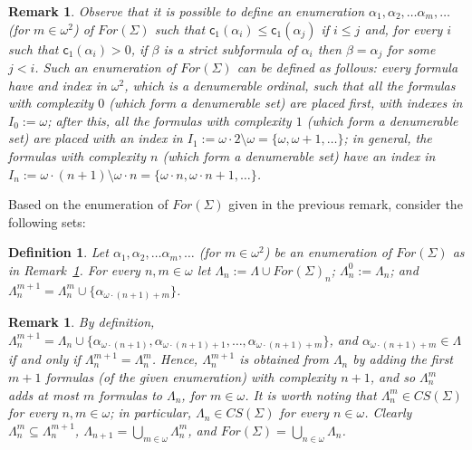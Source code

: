 \documentclass[12pt]{article}
\newtheorem{definition}[theorem]{Definition}
\newtheorem{remark}[theorem]{Remark}
\newcommand {\co} {\textsf{c}}
\begin{document}
\begin{remark} \label{enum:forS4}
Observe that it is possible to define an enumeration  $\alpha_1,\alpha_2,\ldots \alpha_m, \ldots$ (for $m \in \omega^2$)  of $For(\Sigma)$ such that $\co_1(\alpha_i) \leq \co_1(\alpha_j)$ if $i \leq j$ and, for every $i$ such that $\co_1(\alpha_i) >0$, if $\beta$ is a strict subformula of $\alpha_i$ then $\beta=\alpha_j$ for some $j < i$. Such an enumeration of $For(\Sigma)$ can be defined as follows: every formula have and index in $\omega^2$, which is a denumerable ordinal, such that all the formulas with complexity $0$ (which form a denumerable set) are placed first, with indexes in $I_0:=\omega$; after this, all the formulas with complexity $1$ (which form a denumerable set) are placed with an index in $I_1:=\omega\cdot 2\setminus \omega=\{\omega,\omega + 1, \ldots\}$; in general, the formulas with complexity $n$ (which form a denumerable set) have an index in $I_{n}:=\omega\cdot(n+1)\setminus\omega\cdot n=\{\omega\cdot n, \omega\cdot n+1, \ldots\}$.
\end{remark}



Based on the enumeration of $For(\Sigma)$ given in the previous remark, consider the following sets:

\begin{definition}  \label{sets:enum:forS4}
Let $\alpha_1,\alpha_2,\ldots \alpha_m, \ldots$ (for $m \in \omega^2$) be an enumeration of $For(\Sigma)$ as in Remark~\ref{enum:forS4}. For every $n,m \in \omega$ let  ${\Lambda}_n:=\Lambda \cup For(\Sigma)_n$;   ${\Lambda}_n^0:={\Lambda}_n$; and ${\Lambda}_n^{m+1}={\Lambda}_n^m \cup \{\alpha_{\omega\cdot (n+1) +m}\}$.
\end{definition}


\begin{remark} \label{enum2:forS4} By definition, ${\Lambda}_n^{m+1}={\Lambda}_n \cup \{\alpha_{\omega\cdot (n+1)}, \alpha_{\omega\cdot (n+1) +1}, \ldots, \alpha_{\omega\cdot (n+1) +m}\}$, and $\alpha_{\omega\cdot (n+1) +m}\in \Lambda$ if and only if ${\Lambda}_n^{m+1}={\Lambda}_n^m$. Hence, ${\Lambda}_n^{m+1}$ is obtained from ${\Lambda}_n$ by adding the first $m+1$ formulas (of the given enumeration) with complexity $n+1$, and so ${\Lambda}_n^{m}$ adds at most $m$ formulas to ${\Lambda}_n$, for $m \in \omega$.
It is worth noting that ${\Lambda}_n^m \in CS(\Sigma)$ for every $n,m \in \omega$; in particular, ${\Lambda}_n \in CS(\Sigma)$ for every $n \in \omega$. Clearly ${\Lambda}_n^m \subseteq {\Lambda}_n^{m+1}$, ${\Lambda}_{n+1} = \bigcup_{m \in \omega} {\Lambda}_n^m$, and $For(\Sigma)= \bigcup_{n \in \omega} {\Lambda}_n$.
\end{remark}
 
\end{document}
